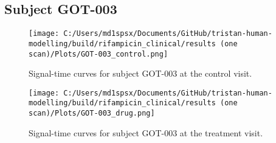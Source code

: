 \documentclass{epflreport}%
\begin{document}
\subsection{Subject GOT{-}003}%
\label{subsec:SubjectGOT{-}003}%

%


\begin{figure}[h!]%
\centering%
\texttt{[image: C:/Users/md1spsx/Documents/GitHub/tristan-human-modelling/build/rifampicin\_clinical/results (one scan)/Plots/GOT-003\_control.png]}%
\caption{Signal{-}time curves for subject GOT{-}003 at the control visit.}%
\end{figure}

%


\begin{figure}[h!]%
\centering%
\texttt{[image: C:/Users/md1spsx/Documents/GitHub/tristan-human-modelling/build/rifampicin\_clinical/results (one scan)/Plots/GOT-003\_drug.png]}%
\caption{Signal{-}time curves for subject GOT{-}003 at the treatment visit.}%
\end{figure}
\end{document}
